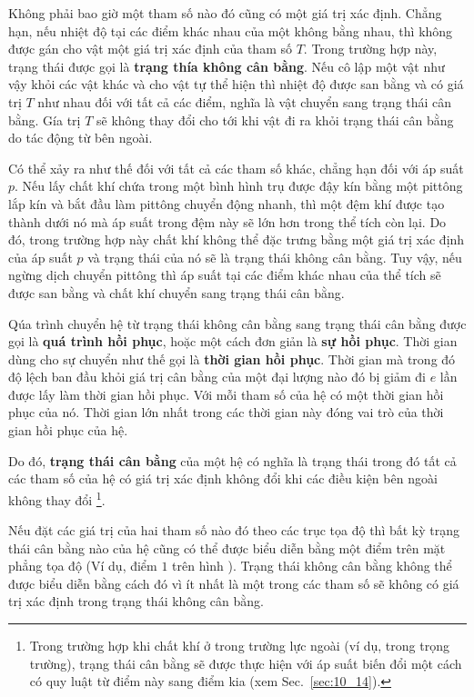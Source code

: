 Không phải bao giờ một tham số nào đó cũng có một giá trị xác định. Chẳng hạn, nếu nhiệt độ tại các điểm khác nhau của một không bằng nhau, thì không được gán cho vật một giá trị xác định của tham số $T$. Trong trường hợp này, trạng thái được gọi là \textbf{trạng thía không cân bằng}. Nếu cô lập một vật như vậy khỏi các vật khác và cho vật tự thể hiện thì nhiệt độ được san bằng và có giá trị $T$ như nhau đối với tất cả các điểm, nghĩa là vật chuyển sang trạng thái cân bằng. Gía trị $T$ sẽ không thay đổi cho tới khi vật đi ra khỏi trạng thái cân bằng do tác động từ bên ngoài.

Có thể xảy ra như thế đối với tất cả các tham số khác, chẳng hạn đối với áp suất $p$. Nếu lấy chất khí chứa trong một bình hình trụ được đậy kín bằng một pittông lắp kín và bắt đầu làm pittông chuyển động nhanh, thì một đệm khí được tạo thành dưới nó mà áp suất trong đệm này sẽ lớn hơn trong thể tích còn lại. Do đó, trong trường hợp này chất khí không thể đặc trưng bằng một giá trị xác định của áp suất  $p$ và trạng thái của nó sẽ là trạng thái không cân bằng. Tuy vậy, nếu ngừng dịch chuyển pittông thì áp suất tại các điểm khác nhau của thể tích sẽ được san bằng và chất khí chuyển sang trạng thái cân bằng.

Qúa trình chuyển hệ từ trạng thái không cân bằng sang trạng thái cân bằng được gọi là \textbf{quá trình hồi phục}, hoặc một cách đơn giản là \textbf{sự hồi phục}. Thời gian dùng cho sự chuyển như thế gọi là \textbf{thời gian hồi phục}. Thời gian mà trong đó độ lệch ban đầu khỏi giá trị cân bằng của một đại lượng nào đó bị giảm đi $e$ lần được lấy làm thời gian hồi phục. Với mỗi tham số của hệ có một thời gian hồi phục của nó. Thời gian lớn nhất trong các thời gian này đóng vai trò của thời gian hồi phục của hệ.

Do đó, \textbf{trạng thái cân bằng} của một hệ có nghĩa là trạng thái trong đó tất cả các tham số của hệ có giá trị xác định không đổi khi các điều kiện bên ngoài không thay đổi \footnote{Trong trường hợp khi chất khí ở trong trường lực ngoài (ví dụ, trong trọng trường), trạng thái cân bằng sẽ được thực hiện với áp suất biến đổi một cách có quy luật từ điểm này sang điểm kia  (xem Sec.~\ref{sec:10_14}).}.

Nếu đặt các giá trị của hai tham số nào đó theo các trục tọa độ thì bất kỳ trạng thái cân bằng nào của hệ cũng có thể được biểu diễn bằng một điểm trên mặt phẳng tọa độ (Ví dụ, điểm $1$ trên hình ). Trạng thái không cân bằng không thể được biểu diễn bằng cách đó vì ít nhất là một trong các tham số sẽ không có giá trị xác định trong trạng thái không cân bằng.

